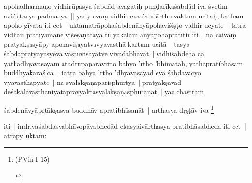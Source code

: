 \documentclass[article,12pt,a4paper]{memoir}
\begin{document}
apohadharmaṇo vidhirūpasya śabdād avagatiḥ puṇḍarīkaśabdād iva śvetim aviśiṣṭasya padmasya || \label{thakur75-60.16} yady evaṃ vidhir eva śabdārtho vaktum ucitaḥ, katham apoho gīyata iti cet | uktamatrāpohaśabdenānyāpohaviśiṣṭo vidhir ucyate | tatra vidhau pratīyamāne viśeṣaṇatayā tulyakālam anyāpohapratītir iti | \label{thakur75-60.19} na caivaṃ pratyakṣasyāpy apohaviṣayatvavyavasthā kartum ucitā | tasya śābdapratyayasyeva vastuviṣayatve vivādābhāvāt | vidhiśabdena ca yathādhyavasāyam atadrūpaparāvṛtto bāhyo 'rtho 'bhimataḥ, yathāpratibhāsaṃ buddhyākāraś ca | tatra bāhyo 'rtho 'dhyavasāyād eva śabdavācyo vyavasthāpyate | na svalakṣaṇaparisphūrtyā | pratyakṣavad deśakālāvasthāniyatapravyaktasvalakṣaṇāsphuraṇāt | yac chāstram
	\pend
      

	  \pstart śabdenāvyāpṛtākṣasya buddhāv apratibhāsanāt | arthasya dṛṣṭāv iva \footnote{\begin{english}(PVin I 15)\end{english}}
	\pend
      

	  \pstart iti | indriyaśabdasvabhāvopāyabhedād ekasyaivārthasya pratibhāsabheda iti cet | atrāpy uktam:
	\pend
      
\end{document}
